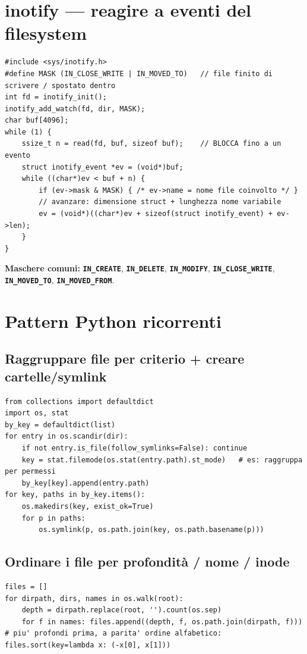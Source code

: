 \documentclass[10pt,a4paper]{article}
\newcommand{\fn}[1]{\texttt{\textbf{#1}}}
\begin{document}
\section{inotify --- reagire a eventi del filesystem}
\begin{lstlisting}[style=c]
#include <sys/inotify.h>
#define MASK (IN_CLOSE_WRITE | IN_MOVED_TO)   // file finito di scrivere / spostato dentro
int fd = inotify_init();
inotify_add_watch(fd, dir, MASK);
char buf[4096];
while (1) {
    ssize_t n = read(fd, buf, sizeof buf);    // BLOCCA fino a un evento
    struct inotify_event *ev = (void*)buf;
    while ((char*)ev < buf + n) {
        if (ev->mask & MASK) { /* ev->name = nome file coinvolto */ }
        // avanzare: dimensione struct + lunghezza nome variabile
        ev = (void*)((char*)ev + sizeof(struct inotify_event) + ev->len);
    }
}
\end{lstlisting}
\textbf{Maschere comuni:} \fn{IN\_CREATE}, \fn{IN\_DELETE}, \fn{IN\_MODIFY}, \fn{IN\_CLOSE\_WRITE}, \fn{IN\_MOVED\_TO}, \fn{IN\_MOVED\_FROM}.

\section{Pattern Python ricorrenti}

\subsection{Raggruppare file per criterio + creare cartelle/symlink}
\begin{lstlisting}[style=py]
from collections import defaultdict
import os, stat
by_key = defaultdict(list)
for entry in os.scandir(dir):
    if not entry.is_file(follow_symlinks=False): continue
    key = stat.filemode(os.stat(entry.path).st_mode)   # es: raggruppa per permessi
    by_key[key].append(entry.path)
for key, paths in by_key.items():
    os.makedirs(key, exist_ok=True)
    for p in paths:
        os.symlink(p, os.path.join(key, os.path.basename(p)))
\end{lstlisting}

\subsection{Ordinare i file per profondità / nome / inode}
\begin{lstlisting}[style=py]
files = []
for dirpath, dirs, names in os.walk(root):
    depth = dirpath.replace(root, '').count(os.sep)
    for f in names: files.append((depth, f, os.path.join(dirpath, f)))
# piu' profondi prima, a parita' ordine alfabetico:
files.sort(key=lambda x: (-x[0], x[1]))
\end{lstlisting}
\end{document}
